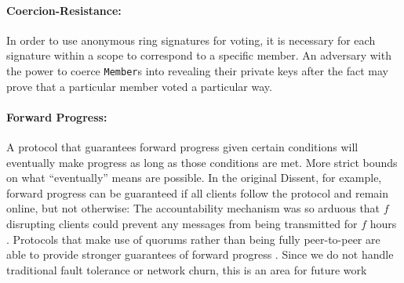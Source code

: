   \paragraph{Coercion-Resistance:} In order to use anonymous ring signatures for voting, it is necessary
    for each signature within a scope to correspond to a specific member. An
    adversary with the power to coerce \texttt{Member}s into revealing their
    private keys after the fact may prove that a particular member voted a
    particular way\cite{lrs}.
  \paragraph{Forward Progress:} A protocol that guarantees forward progress
  given certain conditions will eventually make progress as long as those
  conditions are met. More strict bounds on what ``eventually'' means are
  possible. In the original Dissent, for example, forward progress can be
  guaranteed if all clients follow the protocol and remain online, but not
  otherwise: The accountability mechanism was so arduous that $f$ disrupting
  clients could prevent any messages from being transmitted for $f$ hours
  \cite{verdict}. Protocols that make use of quorums
  rather than being fully peer-to-peer are able to provide stronger guarantees
  of forward progress \cite{paxos}. Since we do not handle traditional fault
  tolerance or network churn,  this is an area
  for future work 
